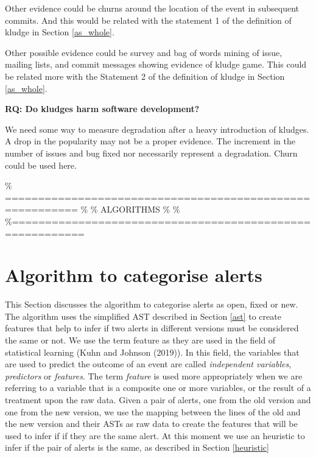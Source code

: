 \documentclass[
]{article}
\begin{document}
Other evidence could be churns around the location of the event in
subsequent commits. And this would be related with the statement 1 of
the definition of kludge in Section \ref{as_whole}.

Other possible evidence could be survey and bag of words mining of
issue, mailing lists, and commit messages showing evidence of kludge
game. This could be related more with the Statement 2 of the definition
of kludge in Section \ref{as_whole}.

\vspace{16px}

\noindent \textbf{RQ: Do kludges harm software development?}
\label{kludge_harm}

We need some way to measure degradation after a heavy introduction of
kludges. A drop in the popularity may not be a proper evidence. The
increment in the number of issues and bug fixed nor necessarily
represent a degradation. Churn could be used here.

\% ========================================================= \% \%
ALGORITHMS \% \%
\%=========================================================

\section{Algorithm to categorise alerts}\label{alg}

This Section discusses the algorithm to categorise alerts as open, fixed
or new. The algorithm uses the simplified AST described in Section
\ref{ast} to create features that help to infer if two alerts in
different versions must be considered the same or not. We use the term
feature as they are used in the field of statistical learning (Kuhn and
Johnson (2019)). In this field, the variables that are used to predict
the outcome of an event are called \emph{independent variables},
\emph{predictors} or \emph{features}. The term \emph{feature} is used
more appropriately when we are referring to a variable that is a
composite one or more variables, or the result of a treatment upon the
raw data. Given a pair of alerts, one from the old version and one from
the new version, we use the mapping between the lines of the old and the
new version and their ASTs as raw data to create the features that will
be used to infer if if they are the same alert. At this moment we use an
heuristic to infer if the pair of alerts is the same, as described in
Section \ref{heuristic}

\begin{center}
\end{center}
\end{document}
